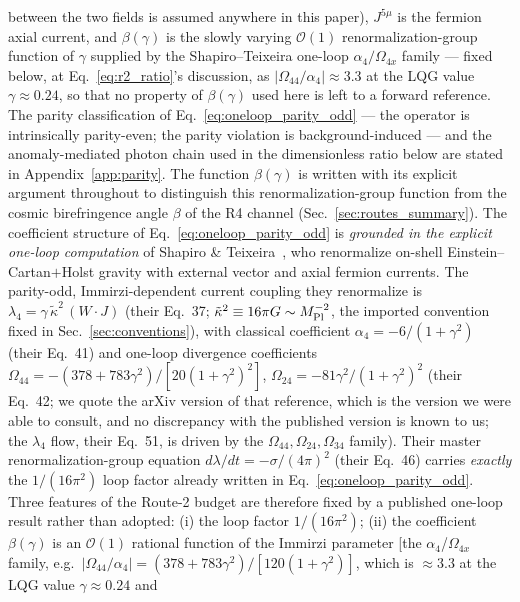 \documentclass[aps,prd,twocolumn,superscriptaddress,showpacs,preprintnumbers,nofootinbib,longbibliography,floatfix]{revtex4-2}
\begin{document}
between the two fields is assumed anywhere in this paper), $J^{5\mu}$
is the fermion axial current, and $\beta(\gamma)$ is the slowly varying
$\mathcal{O}(1)$ renormalization-group function of $\gamma$ supplied by
the Shapiro--Teixeira one-loop $\alpha_4/\Omega_{4x}$ family --- fixed
below, at Eq.~\eqref{eq:r2_ratio}'s discussion, as
$|\Omega_{44}/\alpha_4|\approx3.3$ at the LQG value $\gamma\approx0.24$,
so that no property of $\beta(\gamma)$ used here is left to a forward
reference. The parity classification of
Eq.~\eqref{eq:oneloop_parity_odd} --- the operator is intrinsically
parity-even; the parity violation is background-induced --- and the
anomaly-mediated photon chain used in the dimensionless ratio below are
stated in Appendix~\ref{app:parity}. The function
$\beta(\gamma)$ is written with its explicit argument throughout to
distinguish this renormalization-group function from the cosmic
birefringence angle $\beta$ of the R4 channel (Sec.~\ref{sec:routes_summary}). The
coefficient structure of Eq.~\eqref{eq:oneloop_parity_odd} is
\emph{grounded in the explicit one-loop computation} of Shapiro \&
Teixeira~\cite{ShapiroTeixeira2014}, who renormalize on-shell
Einstein--Cartan${+}$Holst gravity with external vector and axial
fermion currents. The parity-odd, Immirzi-dependent current coupling
they renormalize is $\lambda_4=\gamma\,\tilde\kappa^2\,(W\!\cdot\!J)$ (their
Eq.~37; $\tilde\kappa^2\equiv16\pi G\sim M_{\rm Pl}^{-2}$, the imported
convention fixed in Sec.~\ref{sec:conventions}), with classical coefficient
$\alpha_4=-6/(1+\gamma^2)$ (their Eq.~41) and one-loop divergence
coefficients
$\Omega_{44}=-(378+783\gamma^2)/[20(1+\gamma^2)^2]$,
$\Omega_{24}=-81\gamma^2/(1+\gamma^2)^2$ (their Eq.~42; we quote the
arXiv version of that reference, which is the version we were able to
consult, and no discrepancy with the published version is known to us;
the $\lambda_4$ flow, their Eq.~51, is driven by the
$\Omega_{44},\Omega_{24},\Omega_{34}$ family). Their
master renormalization-group equation $d\lambda/dt=-\sigma/(4\pi)^2$
(their Eq.~46) carries \emph{exactly} the $1/(16\pi^2)$ loop factor
already written in Eq.~\eqref{eq:oneloop_parity_odd}. Three features of
the Route-2 budget are therefore fixed by a published one-loop result
rather than adopted: (i) the loop factor $1/(16\pi^2)$; (ii) the
coefficient $\beta(\gamma)$ is an $\mathcal{O}(1)$ rational function of
the Immirzi parameter [the $\alpha_4$/$\Omega_{4x}$ family, e.g.\
$|\Omega_{44}/\alpha_4|=(378+783\gamma^2)/[120(1+\gamma^2)]$, which is
${\approx}3.3$ at the LQG value $\gamma\!\approx\!0.24$ and
\end{document}
